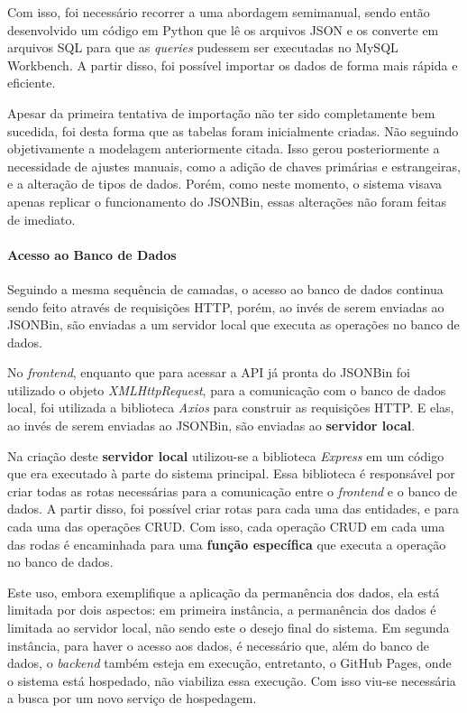 Com isso, foi necessário recorrer a uma abordagem semimanual, sendo então desenvolvido um código em Python que lê os arquivos JSON e os converte em arquivos SQL para que as \textit{queries} pudessem ser executadas no MySQL Workbench. A partir disso, foi possível importar os dados de forma mais rápida e eficiente.

Apesar da primeira tentativa de importação não ter sido completamente bem sucedida, foi desta forma que as tabelas foram inicialmente criadas. Não seguindo objetivamente a modelagem anteriormente citada. Isso gerou posteriormente a necessidade de ajustes manuais, como a adição de chaves primárias e estrangeiras, e a alteração de tipos de dados. Porém, como neste momento, o sistema visava apenas replicar o funcionamento do JSONBin, essas alterações não foram feitas de imediato.


\paragraph*{Acesso ao Banco de Dados}

Seguindo a mesma sequência de camadas, o acesso ao banco de dados continua sendo feito através de requisições HTTP, porém, ao invés de serem enviadas ao JSONBin, são enviadas a um servidor local que executa as operações no banco de dados.

No \textit{frontend}, enquanto que para acessar a API já pronta do JSONBin foi utilizado o objeto \textit{XMLHttpRequest}, para a comunicação com o banco de dados local, foi utilizada a biblioteca \textit{Axios} para construir as requisições HTTP. E elas, ao invés de serem enviadas ao JSONBin, são enviadas ao \textbf{servidor local}.

Na criação deste \textbf{servidor local} utilizou-se a biblioteca \textit{Express} em um código que era executado à parte do sistema principal. Essa biblioteca é responsável por criar todas as rotas necessárias para a comunicação entre o \textit{frontend} e o banco de dados. A partir disso, foi possível criar rotas para cada uma das entidades, e para cada uma das operações CRUD. Com isso, cada operação CRUD em cada uma das rodas é encaminhada para uma \textbf{função específica} que executa a operação no banco de dados.

Este uso, embora exemplifique a aplicação da permanência dos dados, ela está limitada por dois aspectos: em primeira instância, a permanência dos dados é limitada ao servidor local, não sendo este o desejo final do sistema. Em segunda instância, para haver o acesso aos dados, é necessário que, além do banco de dados, o \textit{backend} também esteja em execução, entretanto, o GitHub Pages, onde o sistema está hospedado, não viabiliza essa execução. Com isso viu-se necessária a busca por um novo serviço de hospedagem.

